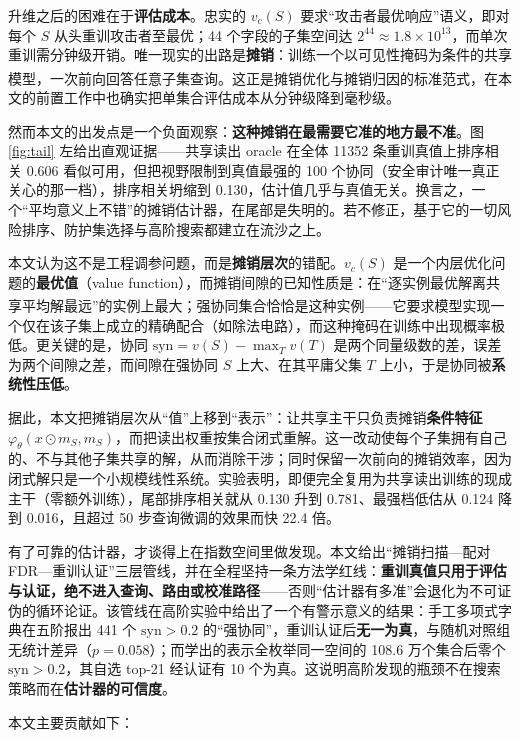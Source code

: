 \documentclass[10.5pt,compsoc,UTF8]{CjC}
\theoremstyle{mystyle}
\newcommand{\upcite}[1]{\textsuperscript{\cite{#1}}}
\newcommand{\syn}{\mathrm{syn}}
\begin{document}
升维之后的困难在于\textbf{评估成本}。忠实的 $v_c(S)$ 要求“攻击者最优响应”语义，即对每个 $S$ 从头重训攻击者至最优；44 个字段的子集空间达 $2^{44}\approx1.8\times10^{13}$，而单次重训需分钟级开销。唯一现实的出路是\textbf{摊销}：训练一个以可见性掩码为条件的共享模型，一次前向回答任意子集查询。这正是摊销优化\upcite{amos2023amortized}与摊销归因\upcite{jethani2022fastshap,covert2023vitshapley}的标准范式，在本文的前置工作中也确实把单集合评估成本从分钟级降到毫秒级。

然而本文的出发点是一个负面观察：\textbf{这种摊销在最需要它准的地方最不准}。图 \ref{fig:tail} 左给出直观证据——共享读出 oracle 在全体 11352 条重训真值上排序相关 0.606 看似可用，但把视野限制到真值最强的 100 个协同（安全审计唯一真正关心的那一档），排序相关坍缩到 0.130，估计值几乎与真值无关。换言之，一个“平均意义上不错”的摊销估计器，在尾部是失明的。若不修正，基于它的一切风险排序、防护集选择与高阶搜索都建立在流沙之上。

本文认为这不是工程调参问题，而是\textbf{摊销层次}的错配。$v_c(S)$ 是一个内层优化问题的\textbf{最优值}（value function），而摊销间隙的已知性质是：在“逐实例最优解离共享平均解最远”的实例上最大\upcite{cremer2018inference,amos2023amortized}；强协同集合恰恰是这种实例——它要求模型实现一个仅在该子集上成立的精确配合（如除法电路），而这种掩码在训练中出现概率极低。更关键的是，协同 $\syn=v(S)-\max_T v(T)$ 是两个同量级数的差，误差为两个间隙之差，而间隙在强协同 $S$ 上大、在其平庸父集 $T$ 上小，于是协同被\textbf{系统性压低}。

据此，本文把摊销层次从“值”上移到“表示”：让共享主干只负责摊销\textbf{条件特征} $\varphi_\theta(x\odot m_S,m_S)$，而把读出权重按集合闭式重解。这一改动使每个子集拥有自己的、不与其他子集共享的解，从而消除干涉；同时保留一次前向的摊销效率，因为闭式解只是一个小规模线性系统。实验表明，即便完全复用为共享读出训练的现成主干（零额外训练），尾部排序相关就从 0.130 升到 0.781、最强档低估从 0.124 降到 0.016，且超过 50 步查询微调的效果而快 22.4 倍。

有了可靠的估计器，才谈得上在指数空间里做发现。本文给出“摊销扫描—配对 FDR—重训认证”三层管线，并在全程坚持一条方法学红线：\textbf{重训真值只用于评估与认证，绝不进入查询、路由或校准路径}——否则“估计器有多准”会退化为不可证伪的循环论证。该管线在高阶实验中给出了一个有警示意义的结果：手工多项式字典在五阶报出 441 个 $\syn>0.2$ 的“强协同”，重训认证后\textbf{无一为真}，与随机对照组无统计差异（$p=0.058$）；而学出的表示全枚举同一空间的 108.6 万个集合后零个 $\syn>0.2$，其自选 top-21 经认证有 10 个为真。这说明高阶发现的瓶颈不在搜索策略而在\textbf{估计器的可信度}。

本文主要贡献如下：
\end{document}
